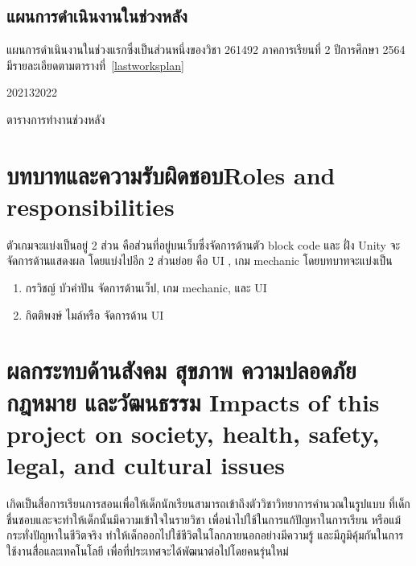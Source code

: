 \subsection{แผนการดำเนินงานในช่วงหลัง}
แผนการดำเนินงานในช่วงแรกซึ่งเป็นส่วนหนึ่งของวิชา 261492 ภาคการเรียนที่ 2 ปีการศึกษา 2564 มีรายละเอียดตามตารางที่~\ref{lastworksplan}
\begin{table}
    \begin{plan}{10}{2021}{3}{2022}
    \end{plan}
    \caption[ตารางการทำงานช่วงหลัง]{ตารางการทำงานช่วงหลัง}
    \label{lastworksplan}
\end{table}

\section{\ifcpe บทบาทและความรับผิดชอบ\else Roles and responsibilities\fi}
ตัวเกมจะแบ่งเป็นอยู่ 2 ส่วน คือส่วนที่อยู่บนเว็บซึ่งจัดการด้านตัว block code และ ฝั่ง Unity จะจัดการด้านแสดงผล โดยแบ่งไปอีก
2 ส่วนย่อย คือ UI , เกม mechanic โดยบทบาทจะแบ่งเป็น
\begin{enumerate}
    \item กรวิชญ์ บัวคำปัน จัดการด้านเว็ป, เกม mechanic, และ UI
    \item กิตติพงษ์ ไมล์หรือ จัดการด้าน UI
\end{enumerate}

\section{\ifcpe%
ผลกระทบด้านสังคม สุขภาพ ความปลอดภัย กฎหมาย และวัฒนธรรม
\else%
Impacts of this project on society, health, safety, legal, and cultural issues
\fi}

เกิดเป็นสื่อการเรียนการสอนเพื่อให้เด็กนักเรียนสามารถเข้าถึงตัววิชาวิทยาการคำนวณในรูปแบบ \newline ที่เด็กชื่นชอบและจะทำให้เด็กนั้นมีความเข้าใจในรายวิชา เพื่อนำไปใช้ในการแก้ปัญหาในการเรียน หรือแม้กระทั่งปัญหาในชีวิตจริง ทำให้เด็กออกไปใช้ชีวิตในโลกภายนอกอย่างมีความรู้ และมีภูมิคุ้มกันในการใช้งานสื่อและเทคโนโลยี เพื่อที่ประเทศจะได้พัฒนาต่อไปโดยคนรุ่นใหม่
